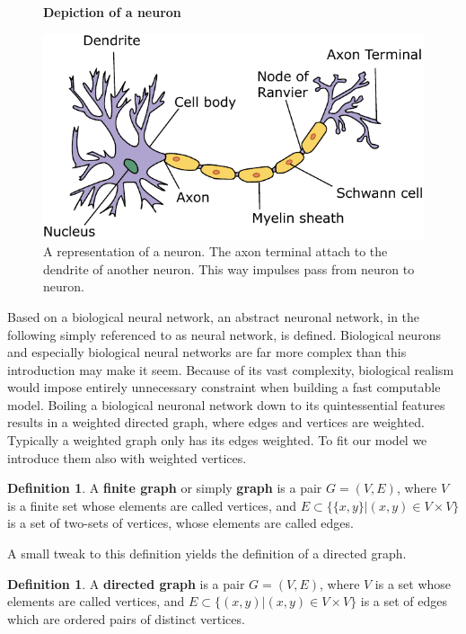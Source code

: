 \documentclass{article}
\theoremstyle{definition}
\newtheorem{definition}[theorem]{Definition}
\newcommand*{\figuretitle}[1]{%
    {\centering%
    \textbf{#1}%
    \par\medskip}%
}
\begin{document}
\begin{figure}[H]
\centering
\figuretitle{Depiction of a neuron}
\includegraphics[scale=0.75]{graphics/neuron.pdf}
\caption{A representation of a neuron. The axon terminal attach to the dendrite of another neuron. This way impulses pass from neuron to neuron\cite{neuron2020}.}
\label{fig:neuron}
\end{figure}

Based on a biological neural network, an abstract neuronal network, in the following simply referenced to as neural network, is defined. Biological neurons and especially biological neural networks are far more complex than this introduction may make it seem. Because of its vast complexity, biological realism would impose entirely unnecessary constraint when building a fast computable model. Boiling a biological neuronal network down to its quintessential features results in a weighted directed graph, where edges and vertices are weighted. Typically a weighted graph only has its edges weighted. To fit our model we introduce them also with weighted vertices.

\begin{definition}\hspace{1sp}\cite[p.~148]{bender2010lists}
A \textbf{finite graph} or simply \textbf{graph} is a pair $G = (V, E)$, where $V$ is a finite set whose elements are called vertices, and $E \subset \{ \{x, y\}|(x,y) \in V \times V \}$ is a set of two-sets of vertices, whose elements are called edges.
\end{definition}

A small tweak to this definition yields the definition of a directed graph.

\begin{definition}
A \textbf{directed graph} is a pair $G = (V, E)$, where $V$ is a set whose elements are called vertices, and $E \subset \{ (x, y)|(x,y) \in V \times V \}$ is a set of edges which are ordered pairs of distinct vertices.
\end{definition}
\end{document}
